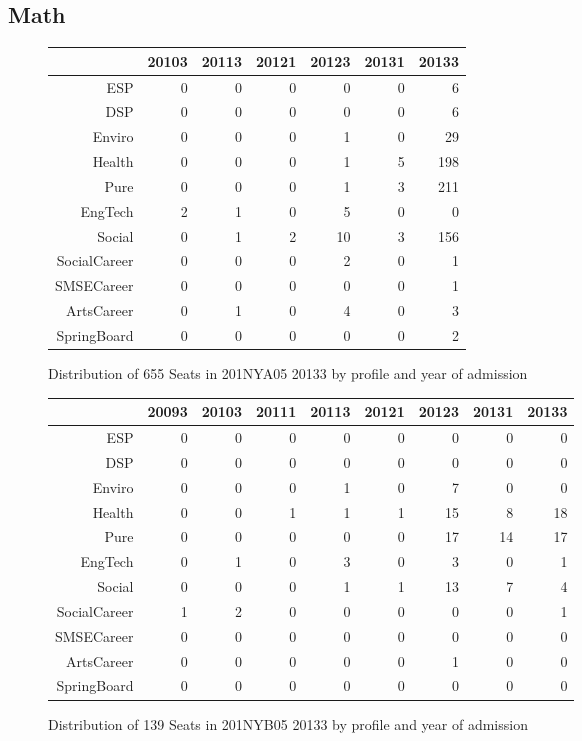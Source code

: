 \documentclass{article}\usepackage[]{graphicx}\usepackage[]{color}
\begin{document}
\subsection{Math}
\begin{figure}[H]
\centering
\begin{tabular}{rrrrrrr}
  \hline
 & 20103 & 20113 & 20121 & 20123 & 20131 & 20133 \\ 
  \hline
ESP &   0 &   0 &   0 &   0 &   0 &   6 \\ 
  DSP &   0 &   0 &   0 &   0 &   0 &   6 \\ 
  Enviro &   0 &   0 &   0 &   1 &   0 &  29 \\ 
  Health &   0 &   0 &   0 &   1 &   5 & 198 \\ 
  Pure &   0 &   0 &   0 &   1 &   3 & 211 \\ 
  EngTech &   2 &   1 &   0 &   5 &   0 &   0 \\ 
  Social &   0 &   1 &   2 &  10 &   3 & 156 \\ 
  SocialCareer &   0 &   0 &   0 &   2 &   0 &   1 \\ 
  SMSECareer &   0 &   0 &   0 &   0 &   0 &   1 \\ 
  ArtsCareer &   0 &   1 &   0 &   4 &   0 &   3 \\ 
  SpringBoard &   0 &   0 &   0 &   0 &   0 &   2 \\ 
   \hline
\end{tabular}
\caption{Distribution of 655 Seats in 201NYA05 20133 by profile and year of admission} 
\end{figure}
\begin{figure}[H]
\centering
\begin{tabular}{rrrrrrrrr}
  \hline
 & 20093 & 20103 & 20111 & 20113 & 20121 & 20123 & 20131 & 20133 \\ 
  \hline
ESP &   0 &   0 &   0 &   0 &   0 &   0 &   0 &   0 \\ 
  DSP &   0 &   0 &   0 &   0 &   0 &   0 &   0 &   0 \\ 
  Enviro &   0 &   0 &   0 &   1 &   0 &   7 &   0 &   0 \\ 
  Health &   0 &   0 &   1 &   1 &   1 &  15 &   8 &  18 \\ 
  Pure &   0 &   0 &   0 &   0 &   0 &  17 &  14 &  17 \\ 
  EngTech &   0 &   1 &   0 &   3 &   0 &   3 &   0 &   1 \\ 
  Social &   0 &   0 &   0 &   1 &   1 &  13 &   7 &   4 \\ 
  SocialCareer &   1 &   2 &   0 &   0 &   0 &   0 &   0 &   1 \\ 
  SMSECareer &   0 &   0 &   0 &   0 &   0 &   0 &   0 &   0 \\ 
  ArtsCareer &   0 &   0 &   0 &   0 &   0 &   1 &   0 &   0 \\ 
  SpringBoard &   0 &   0 &   0 &   0 &   0 &   0 &   0 &   0 \\ 
   \hline
\end{tabular}
\caption{Distribution of 139 Seats in 201NYB05 20133 by profile and year of admission} 
\end{figure}
\end{document}
